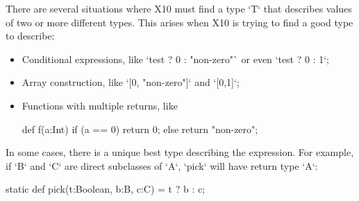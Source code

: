 There are several situations where X10 must find a type \xcd`T` that describes
values of two or more different types.  This arises when X10 is trying to find
a good type to describe: 
\begin{itemize}
\item Conditional expressions, like \xcd`test ? 0 : "non-zero"` or even 
      \xcd`test ? 0 : 1`;
\item Array construction, like \xcd`[0, "non-zero"]` and 
      \xcd`[0,1]`;
\item Functions with multiple returns, like
\begin{xten}
def f(a:Int) {
  if (a == 0) return 0;
  else return "non-zero";
}
\end{xten}
\end{itemize}

In some cases, there is a unique best type describing the expression.  For
example, if \xcd`B` and \xcd`C` are direct subclasses of \xcd`A`, \xcd`pick`
will have return type \xcd`A`: 
\begin{xten}
static def pick(t:Boolean, b:B, c:C) = t ? b : c;  
\end{xten}

